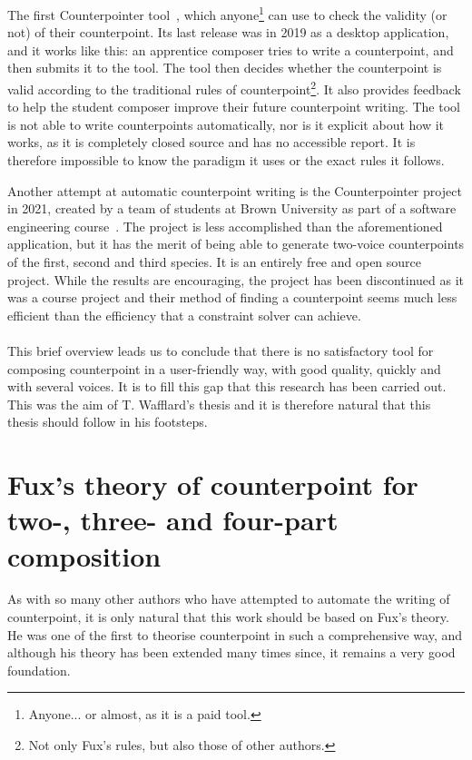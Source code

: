 The first Counterpointer tool~\cite{counterpointer_ms}, which anyone\footnote{Anyone... or almost, as it is a paid tool.} can use to check the validity (or not) of their counterpoint. Its last release was in 2019 as a desktop application, and it works like this: an apprentice composer tries to write a counterpoint, and then submits it to the tool. The tool then decides whether the counterpoint is valid according to the traditional rules of counterpoint\footnote{Not only Fux's rules, but also those of other authors.}. It also provides feedback to help the student composer improve their future counterpoint writing. The tool is not able to write counterpoints automatically, nor is it explicit about how it works, as it is completely closed source and has no accessible report. It is therefore impossible to know the paradigm it uses or the exact rules it follows.

Another attempt at automatic counterpoint writing is the Counterpointer project in 2021, created by a team of students at Brown University as part of a software engineering course~\cite{counterpointer_project}. The project is less accomplished than the aforementioned application, but it has the merit of being able to generate two-voice counterpoints of the first, second and third species. It is an entirely free and open source project. While the results are encouraging, the project has been discontinued as it was a course project and their method of finding a counterpoint seems much less efficient than the efficiency that a constraint solver can achieve. 


\paragraph{}
This brief overview leads us to conclude that there is no satisfactory tool for composing counterpoint in a user-friendly way, with good quality, quickly and with several voices. It is to fill this gap that this research has been carried out. This was the aim of T. Wafflard's thesis and it is therefore natural that this thesis should follow in his footsteps.


\section{Fux's theory of counterpoint for two-, three- and four-part composition}
As with so many other authors who have attempted to automate the writing of counterpoint, it is only natural that this work should be based on Fux's theory. He was one of the first to theorise counterpoint in such a comprehensive way, and although his theory has been extended many times since, it remains a very good foundation.

